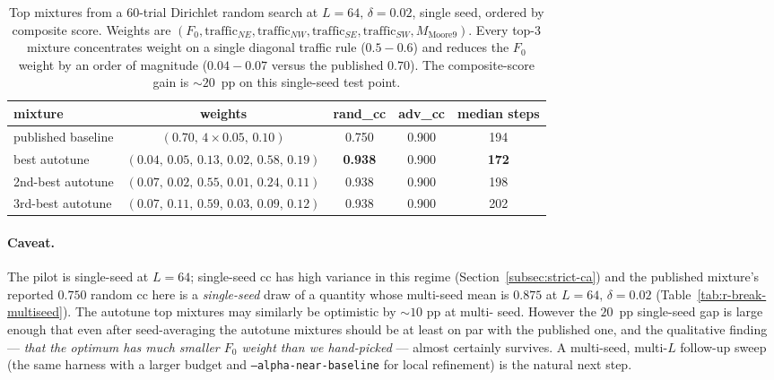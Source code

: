 \documentclass[11pt,a4paper]{article}
\begin{document}
\begin{table}[h]\centering\small
\begin{tabular}{l c c c c}
\toprule
mixture & weights & rand\_cc & adv\_cc & median steps \\
\midrule
published baseline       & \((0.70,\,4{\times}0.05,\,0.10)\) & 0.750 & 0.900 & 194 \\
best autotune           & \((0.04,\,0.05,\,0.13,\,0.02,\,0.58,\,0.19)\) & \textbf{0.938} & 0.900 & \textbf{172} \\
2nd-best autotune       & \((0.07,\,0.02,\,0.55,\,0.01,\,0.24,\,0.11)\) & 0.938 & 0.900 & 198 \\
3rd-best autotune       & \((0.07,\,0.11,\,0.59,\,0.03,\,0.09,\,0.12)\) & 0.938 & 0.900 & 202 \\
\bottomrule
\end{tabular}
\caption{Top mixtures from a 60-trial Dirichlet random search at
\(L=64,\,\delta=0.02\), single seed, ordered by composite score.
Weights are
\((F_0, \mathrm{traffic}_{NE}, \mathrm{traffic}_{NW},
   \mathrm{traffic}_{SE}, \mathrm{traffic}_{SW}, M_{\mathrm{Moore9}})\).
Every top-3 mixture concentrates weight on a single diagonal
traffic rule (\(0.5{-}0.6\)) and reduces the \(F_0\) weight by an
order of magnitude (\(0.04{-}0.07\) versus the published \(0.70\)).
The composite-score gain is \({\sim}\!20\)~pp on this single-seed
test point.}
\label{tab:schedule-autotune-pilot}
\end{table}

\paragraph{Caveat.}
The pilot is single-seed at \(L=64\); single-seed cc has high variance
in this regime (Section~\ref{subsec:strict-ca}) and the published
mixture's reported \(0.750\) random cc here is a \emph{single-seed}
draw of a quantity whose multi-seed mean is \(0.875\) at \(L=64,\,
\delta=0.02\) (Table~\ref{tab:r-break-multiseed}).  The autotune top
mixtures may similarly be optimistic by \({\sim}\!10\) pp at multi-
seed.  However the \(20\)~pp single-seed gap is large enough that
even after seed-averaging the autotune mixtures should be at least
on par with the published one, and the qualitative finding ---
\emph{that the optimum has much smaller \(F_0\) weight than we
hand-picked} --- almost certainly survives.  A multi-seed,
multi-\(L\) follow-up sweep (the same harness with a larger budget
and \texttt{--alpha-near-baseline} for local refinement) is the
natural next step.
\end{document}
